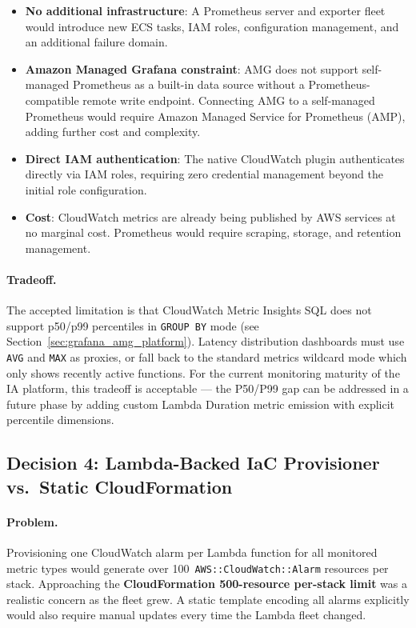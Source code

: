 \begin{itemize}
    \item \textbf{No additional infrastructure}: A Prometheus server
          and exporter fleet would introduce new ECS tasks, IAM roles,
          configuration management, and an additional failure domain.

    \item \textbf{Amazon Managed Grafana constraint}: AMG does not
          support self-managed Prometheus as a built-in data source
          without a Prometheus-compatible remote write endpoint.
          Connecting AMG to a self-managed Prometheus would require
          Amazon Managed Service for Prometheus (AMP), adding further
          cost and complexity.

    \item \textbf{Direct IAM authentication}: The native CloudWatch
          plugin authenticates directly via IAM roles, requiring zero
          credential management beyond the initial role configuration.

    \item \textbf{Cost}: CloudWatch metrics are already being published
          by AWS services at no marginal cost. Prometheus would require
          scraping, storage, and retention management.
\end{itemize}

\paragraph{Tradeoff.}
The accepted limitation is that CloudWatch Metric Insights SQL does not
support p50/p99 percentiles in \texttt{GROUP BY} mode
(see Section~\ref{sec:grafana_amg_platform}). Latency distribution
dashboards must use \texttt{AVG} and \texttt{MAX} as proxies, or fall
back to the standard metrics wildcard mode which only shows recently
active functions. For the current monitoring maturity of the IA platform,
this tradeoff is acceptable --- the P50/P99 gap can be addressed in a
future phase by adding custom Lambda Duration metric emission with
explicit percentile dimensions.

\subsection{Decision 4: Lambda-Backed IaC Provisioner vs.\ Static CloudFormation}
\label{sec:decision_lambda_provisioner}

\paragraph{Problem.}
Provisioning one CloudWatch alarm per Lambda function for all monitored
metric types would generate over 100~\texttt{AWS::CloudWatch::Alarm}
resources per stack. Approaching the \textbf{CloudFormation 500-resource
per-stack limit} was a realistic concern as the fleet grew. A static
template encoding all alarms explicitly would also require manual
updates every time the Lambda fleet changed.

